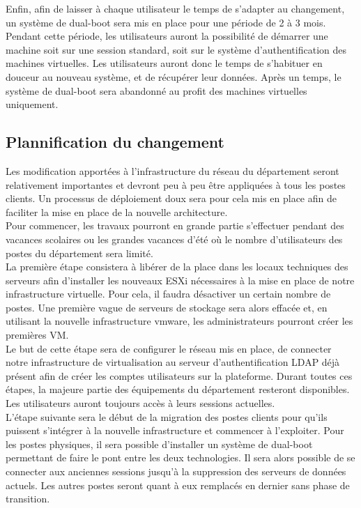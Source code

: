 Enfin, afin de laisser à chaque utilisateur le temps de s’adapter au changement, un système de dual-boot sera mis en place pour une période de 2 à 3 mois. Pendant cette période, les utilisateurs auront la possibilité de démarrer une machine soit sur une session standard, soit sur le système d’authentification des machines virtuelles. Les utilisateurs auront donc le temps de s’habituer en douceur au nouveau système, et de récupérer leur données. Après un temps, le système de dual-boot sera abandonné au profit des machines virtuelles uniquement.

\subsection{Plannification du changement}

	Les modification apportées à l’infrastructure du réseau du département seront relativement importantes et devront peu à peu être appliquées à tous les postes clients. Un processus de déploiement doux sera pour cela mis en place afin de faciliter la mise en place de la nouvelle architecture. \\
	Pour commencer, les travaux pourront en grande partie s’effectuer pendant des vacances scolaires ou les grandes vacances d’été où le nombre d’utilisateurs des postes du département sera limité. \\
La première étape consistera à libérer de la place dans les locaux techniques des serveurs afin d’installer les nouveaux ESXi nécessaires à la mise en place de notre infrastructure virtuelle. Pour cela, il faudra désactiver un certain nombre de postes. Une première vague de serveurs de stockage sera alors effacée et, en utilisant la nouvelle infrastructure vmware, les administrateurs pourront créer les premières VM. \\
Le but de cette étape sera de configurer le réseau mis en place, de connecter notre infrastructure de virtualisation au serveur d’authentification LDAP déjà présent afin de créer les comptes utilisateurs sur la plateforme. Durant toutes ces étapes, la majeure partie des équipements du département resteront disponibles. Les utilisateurs auront toujours accès à leurs sessions actuelles.\\
	L’étape suivante sera le début de la migration des postes clients pour qu’ils puissent s’intégrer à la nouvelle infrastructure et commencer à l’exploiter. Pour les postes physiques, il sera possible d’installer un système de dual-boot permettant de faire le pont entre les deux technologies. Il sera alors possible de se connecter aux anciennes sessions jusqu’à la suppression des serveurs de données actuels. Les autres postes seront quant à eux remplacés en dernier sans phase de transition. \\
